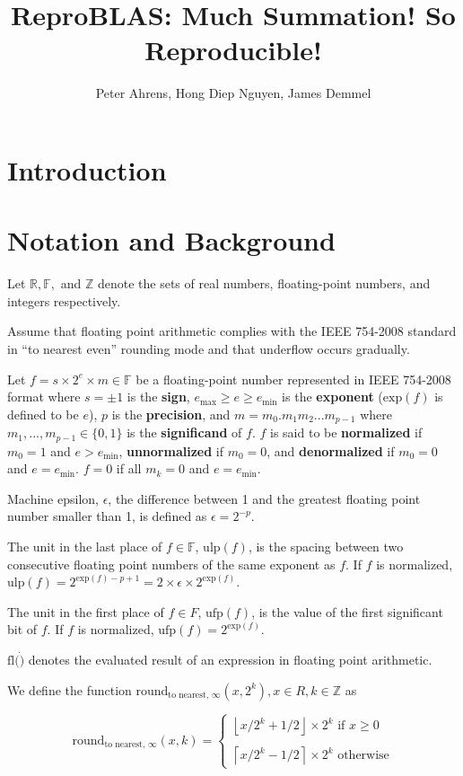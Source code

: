 \documentclass[12pt]{article}
\author{Peter Ahrens, Hong Diep Nguyen, James Demmel}
\title{ReproBLAS: Much Summation! So Reproducible!}
\providecommand{\ceil}[1]{\left \lceil #1 \right \rceil }
\providecommand{\floor}[1]{\left \lfloor #1 \right \rfloor }
\providecommand{\R}{\ensuremath{\mathbb{R}}}
\providecommand{\F}{\ensuremath{\mathbb{F}}}
\providecommand{\Z}{\ensuremath{\mathbb{Z}}}
\providecommand{\exp}{\ensuremath{\text{exp}}}
\providecommand{\min}{\ensuremath{\text{min}}}
\providecommand{\max}{\ensuremath{\text{max}}}
\providecommand{\ulp}{\ensuremath{\text{ulp}}}
\providecommand{\ufp}{\ensuremath{\text{ufp}}}
\providecommand{\fl}{\ensuremath{\text{fl}}}
\providecommand{\roundtonearestinfty}{\ensuremath{\text{round}_\text{to nearest, $\infty$}}}
\theoremstyle{plain}
\begin{document}
\noindent
\maketitle
\tableofcontents
\newpage
\section{Introduction}

\section{Notation and Background}
  Let $\R, \F, $ and $\Z$ denote the sets of real numbers, floating-point numbers, and integers respectively.

  Assume that floating point arithmetic complies with the IEEE 754-2008 standard \cite{ieee754} in ``to nearest even'' rounding mode and that underflow occurs gradually.

  Let $f = s \times 2^e \times m \in \F$ be a floating-point number represented in IEEE 754-2008 format \cite{ieee754} where $s = \pm 1$ is the \textbf{sign}, $e_{\max} \geq e \geq e_{\min}$ is the \textbf{exponent} ($\exp(f)$ is defined to be $e$), $p$ is the \textbf{precision}, and $m = m_0.m_1m_2...m_{p-1}$ where $m_1, ..., m_{p - 1} \in \{0, 1\}$ is the \textbf{significand} of $f$. $f$ is said to be \textbf{normalized} if $m_0 = 1$ and $e > e_{\min}$, \textbf{unnormalized} if $m_0 = 0$, and \textbf{denormalized} if $m_0 = 0$ and $e = e_{\min}$. $f = 0$ if all $m_k = 0$ and $e = e_{\min}$.

  Machine epsilon, $\epsilon$, the difference between 1 and the greatest floating point number smaller than 1, is defined as $\epsilon = 2^{-p}$.

  The unit in the last place of $f \in \F$, $\ulp(f)$, is the spacing between two consecutive floating point numbers of the same exponent as $f$. If $f$ is normalized, $\ulp(f) = 2^{\exp(f) - p + 1} = 2 \times \epsilon \times 2^{\exp(f)}$.

  The unit in the first place of $f \in F$, $\ufp(f)$, is the value of the first significant bit of $f$. If $f$ is normalized, $\ufp(f) = 2^{\exp(f)}$.

  $\fl(\dot)$ denotes the evaluated result of an expression in floating point arithmetic.

  We define the function $\roundtonearestinfty(x, 2^k), x \in R, k \in \Z$ as

  \begin{equation*}
  \roundtonearestinfty(x, k) = \begin{cases}\floor{x/2^k + 1/2} \times 2^k \text{ if } x \geq 0\\ \\ \ceil{x/2^k - 1/2}\times 2^k \text{ otherwise}\end{cases}
  \end{equation*}
\end{document}
